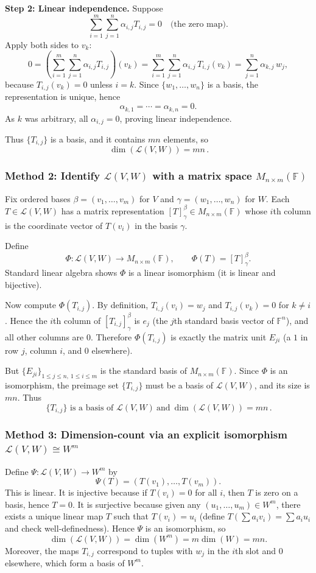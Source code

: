 \documentclass[12pt]{article}
\newcommand{\F}{\mathbb{F}}
\newcommand{\cL}{\mathcal{L}}
\begin{document}
\medskip
\noindent\textbf{Step 2: Linear independence.}
Suppose
\[
\sum_{i=1}^m\sum_{j=1}^n \alpha_{i,j} T_{i,j}=0
\quad\text{(the zero map)}.
\]
Apply both sides to $v_k$:
\[
0
=
\left(\sum_{i=1}^m\sum_{j=1}^n \alpha_{i,j} T_{i,j}\right)(v_k)
=
\sum_{i=1}^m\sum_{j=1}^n \alpha_{i,j}\, T_{i,j}(v_k)
=
\sum_{j=1}^n \alpha_{k,j}\, w_j,
\]
because $T_{i,j}(v_k)=0$ unless $i=k$. Since $\{w_1,\dots,w_n\}$ is a basis, the representation is unique, hence
\[
\alpha_{k,1}=\cdots=\alpha_{k,n}=0.
\]
As $k$ was arbitrary, all $\alpha_{i,j}=0$, proving linear independence.

Thus $\{T_{i,j}\}$ is a basis, and it contains $mn$ elements, so
\[
\boxed{\,\dim(\cL(V,W))=mn\,}.
\]

\subsubsection{Method 2: Identify $\cL(V,W)$ with a matrix space $M_{n\times m}(\F)$}
Fix ordered bases $\beta=(v_1,\dots,v_m)$ for $V$ and $\gamma=(w_1,\dots,w_n)$ for $W$.
Each $T\in\cL(V,W)$ has a matrix representation $[T]_\gamma^\beta\in M_{n\times m}(\F)$ whose $i$th column is
the coordinate vector of $T(v_i)$ in the basis $\gamma$.

Define
\[
\Phi:\cL(V,W)\to M_{n\times m}(\F),\qquad \Phi(T)=[T]_\gamma^\beta.
\]
Standard linear algebra shows $\Phi$ is a linear isomorphism (it is linear and bijective).

Now compute $\Phi(T_{i,j})$. By definition, $T_{i,j}(v_i)=w_j$ and $T_{i,j}(v_k)=0$ for $k\neq i$.
Hence the $i$th column of $[T_{i,j}]_\gamma^\beta$ is $e_j$ (the $j$th standard basis vector of $\F^n$),
and all other columns are $0$. Therefore $\Phi(T_{i,j})$ is exactly the matrix unit $E_{j i}$ (a $1$ in row $j$,
column $i$, and $0$ elsewhere).

But $\{E_{j i}\}_{1\le j\le n,\ 1\le i\le m}$ is the standard basis of $M_{n\times m}(\F)$.
Since $\Phi$ is an isomorphism, the preimage set $\{T_{i,j}\}$ must be a basis of $\cL(V,W)$, and its size is $mn$.
Thus
\[
\boxed{\,\{T_{i,j}\}\text{ is a basis of }\cL(V,W)\ \text{and}\ \dim(\cL(V,W))=mn\,}.
\]

\subsubsection{Method 3: Dimension-count via an explicit isomorphism $\cL(V,W)\cong W^m$}
Define $\Psi:\cL(V,W)\to W^m$ by
\[
\Psi(T)=(T(v_1),\dots,T(v_m)).
\]
This is linear. It is injective because if $T(v_i)=0$ for all $i$, then $T$ is zero on a basis, hence $T=0$.
It is surjective because given any $(u_1,\dots,u_m)\in W^m$, there exists a unique linear map $T$ such that
$T(v_i)=u_i$ (define $T(\sum a_i v_i)=\sum a_i u_i$ and check well-definedness).
Hence $\Psi$ is an isomorphism, so
\[
\dim(\cL(V,W))=\dim(W^m)=m\dim(W)=mn.
\]
Moreover, the maps $T_{i,j}$ correspond to tuples with $w_j$ in the $i$th slot and $0$ elsewhere, which form a basis of $W^m$.
\end{document}
